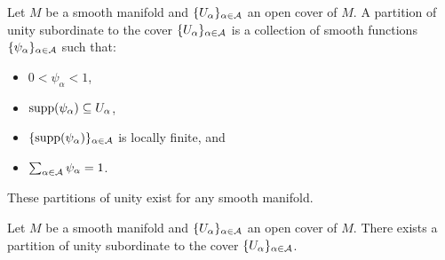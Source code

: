 \begin{definition}\label{def: partition of unity}
    Let $M$ be a smooth manifold and $\{U_{\alpha}\}_{\alpha\in\mathcal{A}}$ an open cover of $M$. A partition of unity subordinate to the cover $\{U_{\alpha}\}_{\alpha\in\mathcal{A}}$ is a collection of smooth functions $\{\psi_{\alpha}\}_{\alpha\in\mathcal{A}}$ such that:
    \begin{itemize}
        \item $0<\psi_{\alpha}<1$, 
        \item $\mathrm{supp}(\psi_{\alpha})\subseteq U_{\alpha}$,
        \item $\{\mathrm{supp}(\psi_{\alpha})\}_{\alpha\in\mathcal{A}}$ is locally finite, and
        \item $\sum_{\alpha\in\mathcal{A}}\psi_{\alpha}=1$. 
    \end{itemize}
\end{definition}
These partitions of unity exist for any smooth manifold. 
\begin{theorem}\label{thm: existence of partitions of unity}
    Let $M$ be a smooth manifold and $\{U_{\alpha}\}_{\alpha\in\mathcal{A}}$ an open cover of $M$. There exists a partition of unity subordinate to the cover $\{U_{\alpha}\}_{\alpha\in\mathcal{A}}$.
\end{theorem}
